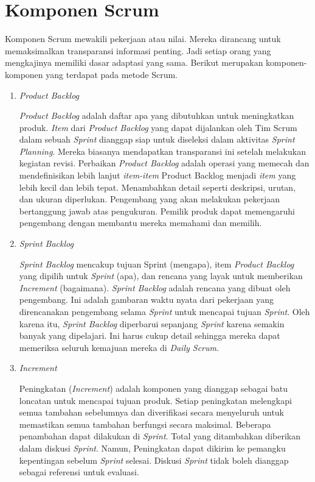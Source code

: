 \section{Komponen Scrum}
Komponen Scrum mewakili pekerjaan atau nilai. Mereka dirancang untuk memaksimalkan transparansi informasi penting. Jadi setiap orang yang mengkajinya memiliki dasar adaptasi yang sama. Berikut merupakan komponen-komponen yang terdapat pada metode Scrum.
\begin{enumerate}
	\item \textit{Product Backlog}
	
	\textit{Product Backlog} adalah daftar apa yang dibutuhkan untuk meningkatkan produk. \textit{Item} dari \textit{Product Backlog} yang dapat dijalankan oleh Tim Scrum dalam sebuah \textit{Sprint} dianggap siap untuk diseleksi dalam aktivitas \textit{Sprint Planning}. Mereka biasanya mendapatkan transparansi ini setelah melakukan kegiatan revisi. Perbaikan \textit{Product Backlog} adalah operasi yang memecah dan mendefinisikan lebih lanjut \textit{item-item} Product Backlog menjadi \textit{item} yang lebih kecil dan lebih tepat. Menambahkan detail seperti deskripsi, urutan, dan ukuran diperlukan. Pengembang yang akan melakukan pekerjaan bertanggung jawab atas pengukuran. Pemilik produk dapat memengaruhi pengembang dengan membantu mereka memahami dan memilih.
	
	\item \textit{Sprint Backlog}
	
	\textit{Sprint Backlog} mencakup tujuan Sprint (mengapa), item \textit{Product Backlog} yang dipilih untuk \textit{Sprint} (apa), dan rencana yang layak untuk memberikan \textit{Increment} (bagaimana). \textit{Sprint Backlog} adalah rencana yang dibuat oleh pengembang. Ini adalah gambaran waktu nyata dari pekerjaan yang direncanakan pengembang selama \textit{Sprint} untuk mencapai tujuan \textit{Sprint}. Oleh karena itu, \textit{Sprint Backlog} diperbarui sepanjang \textit{Sprint} karena semakin banyak yang dipelajari. Ini harus cukup detail sehingga mereka dapat memeriksa seluruh kemajuan mereka di \textit{Daily Scrum}.
	
	\item \textit{Increment}
	
	Peningkatan (\textit{Increment}) adalah komponen yang dianggap sebagai batu loncatan untuk mencapai tujuan produk. Setiap peningkatan melengkapi semua tambahan sebelumnya dan diverifikasi secara menyeluruh untuk memastikan semua tambahan berfungsi secara maksimal. Beberapa penambahan dapat dilakukan di \textit{Sprint}. Total yang ditambahkan diberikan dalam diskusi \textit{Sprint}. Namun, Peningkatan dapat dikirim ke pemangku kepentingan sebelum \textit{Sprint} selesai. Diskusi \textit{Sprint} tidak boleh dianggap sebagai referensi untuk evaluasi. \citep{schwaber2020}
	
\end{enumerate}